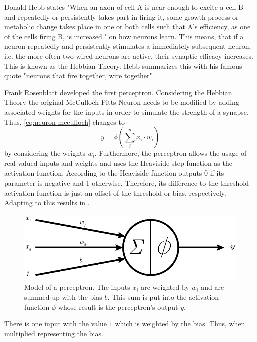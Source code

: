 Donald Hebb states "When an axon of cell A is near enough to excite a cell B and repeatedly or persistently takes part in firing it, some growth process or metabolic change takes place in one or both cells such that A's efficiency, as one of the cells firing B, is increased."\cite{Hebb1949} on how neurons learn.
This means, that if a neuron repeatedly and persistently stimulates a immediately subsequent neuron, i.e. the more often two wired neurons are active, their synaptic efficacy increases.
This is known as the Hebbian Theory.
Hebb summarizes this with his famous quote "neurons that fire together, wire together".

Frank Rosenblatt developed the first perceptron\cite{Rosenblatt58}.
Considering the Hebbian Theory the original McCulloch-Pitts-Neuron needs to be modified by adding associated weights for the inputs in order to simulate the strength of a synapse.
Thus, \eqref{eq:neuron-mcculloch} changes to
\begin{equation}
	\label{eq:neuron}
	y = \phi \left( \sum_{i}^{n} x_i \cdot w_i \right)
\end{equation}
by considering the weights $w_i$.
Furthermore, the perceptron allows the usage of real-valued inputs and weights and uses the Heaviside step function as the activation function.
According to  the Heaviside function outputs 0 if its parameter is negative and 1 otherwise.
Therefore, its difference to the threshold activation function is just an offset of the threshold or bias, respectively.
Adapting  to this results in .
\begin{figure}
	\centering
	\includegraphics{images/perceptron}
	\caption[Model of a Perceptron]{Model of a perceptron. The inputs $x_i$ are weighted by $w_i$ and are summed up with the bias $b$. This sum is put into the activation function $\phi$ whose result is the perceptron's output $y$.}
	\label{fig:perceptron}
\end{figure}
There is one input with the value $1$ which is weighted by the bias.
Thus, when multiplied representing the bias.
